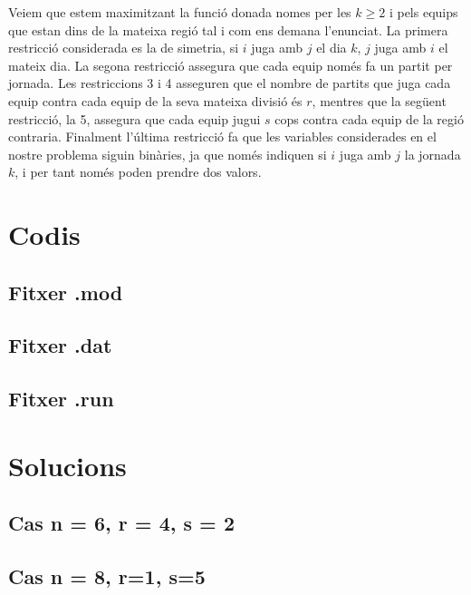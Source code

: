 \documentclass[12pt, a4papre]{article}
\begin{document}
	Veiem que estem maximitzant la funció donada nomes per les $k \geq 2$ i pels equips que estan dins de la mateixa regió tal i com ens demana l'enunciat. La primera restricció considerada es la de simetria, si $i$ juga amb $j$ el dia $k$, $j$ juga amb $i$ el mateix dia. La segona restricció assegura que cada equip només fa un partit per jornada. Les restriccions 3 i 4 asseguren que el nombre de partits que juga cada equip contra cada equip de la seva mateixa divisió és $r$, mentres que la següent restricció, la 5,  assegura que cada equip jugui $s$ cops contra cada equip de la regió contraria. Finalment l'última restricció fa que les variables considerades en el nostre problema siguin binàries, ja que només indiquen si $i$ juga amb $j$ la jornada $k$, i per tant només poden prendre dos valors.
	
	\newpage
	\section{Codis}
	
	\subsection{Fitxer .mod}
	
	
	\subsection{Fitxer .dat}
	
	
	\subsection{Fitxer .run}
	
	
	\section{Solucions}
	\subsection{Cas n = 6, r = 4, s = 2}
	
	
	\newpage
	\subsection{Cas n = 8, r=1, s=5}
	
\end{document}

